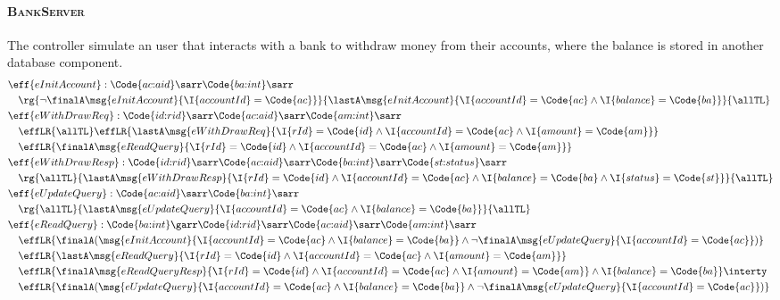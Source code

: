 \paragraph{\textsc{BankServer}} The controller simulate an user that interacts with a bank to withdraw money from their accounts, where the balance is stored in another database component.
{\small\begin{align*}
  &\eff{eInitAccount}: \Code{ac{:}aid} \sarr \Code{ba{:}int} \sarr 
  \\&\quad \rg{\neg\finalA\msg{eInitAccount}{\I{accountId} = \Code{ac}}}{\lastA\msg{eInitAccount}{\I{accountId} = \Code{ac} \land \I{balance} = \Code{ba}}}{\allTL}
  \\&\eff{eWithDrawReq}: \Code{id{:}rid} \sarr \Code{ac{:}aid} \sarr \Code{am{:}int} \sarr 
  \\&\quad \effLR{\allTL}\effLR{\lastA\msg{eWithDrawReq}{\I{rId} = \Code{id}\land\I{accountId} = \Code{ac} \land \I{amount} = \Code{am}}}
  \\&\quad \effLR{\finalA\msg{eReadQuery}{\I{rId} = \Code{id}\land\I{accountId} = \Code{ac} \land \I{amount} = \Code{am}}}
  \\&\eff{eWithDrawResp}: \Code{id{:}rid} \sarr \Code{ac{:}aid} \sarr \Code{ba{:}int} \sarr \Code{st{:}status} \sarr 
  \\&\quad \rg{\allTL}{\lastA\msg{eWithDrawResp}{\I{rId} = \Code{id}\land\I{accountId} = \Code{ac} \land \I{balance} = \Code{ba} \land \I{status} = \Code{st}}}{\allTL}
  \\&\eff{eUpdateQuery}: \Code{ac{:}aid} \sarr \Code{ba{:}int} \sarr
  \\&\quad \rg{\allTL}{\lastA\msg{eUpdateQuery}{\I{accountId} = \Code{ac} \land \I{balance} = \Code{ba}}}{\allTL}
  \\&\eff{eReadQuery}: \Code{ba{:}int} \garr \Code{id{:}rid} \sarr \Code{ac{:}aid} \sarr \Code{am{:}int} \sarr 
  \\&\quad \effLR{\finalA (\msg{eInitAccount}{\I{accountId} = \Code{ac} \land \I{balance} = \Code{ba}} \land \neg\finalA \msg{eUpdateQuery}{\I{accountId} = \Code{ac}})}
  \\&\quad \effLR{\lastA\msg{eReadQuery}{\I{rId} = \Code{id}\land\I{accountId} = \Code{ac} \land \I{amount} = \Code{am}}}
  \\&\quad \effLR{\finalA\msg{eReadQueryResp}{\I{rId} = \Code{id}\land\I{accountId} = \Code{ac} \land \I{amount} = \Code{am}}\land \I{balance} = \Code{ba}} \interty
  \\&\quad \effLR{\finalA (\msg{eUpdateQuery}{\I{accountId} = \Code{ac} \land \I{balance} = \Code{ba}} \land \neg\finalA \msg{eUpdateQuery}{\I{accountId} = \Code{ac}})}

\end{align*}}
